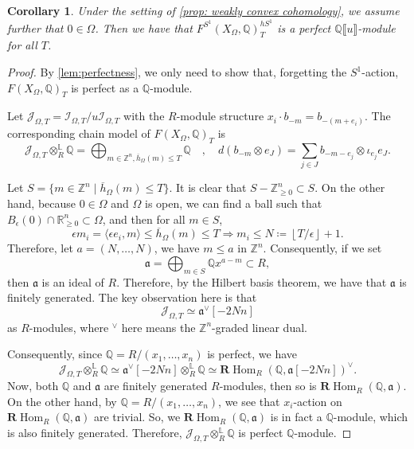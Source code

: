 \documentclass[11pt]{amsart}
\numberwithin{equation}{section}
\theoremstyle{plain}
\newtheorem{Coro}[coro]{Corollary}
\theoremstyle{definition}
\theoremstyle{remark}
\newcommand{\bQ} { {\mathbb{Q}}}
\newcommand{\bZ} { {\mathbb{Z}}}
\newcommand{\bR} { {\mathbb{R}}}
\newcommand{\fpw}[1]{{\llbracket #1\rrbracket}}
\newcommand\Hom{\operatorname{Hom}}
\def\lf{\left\lfloor}
\def\rf{\right\rfloor}
\begin{document}
\begin{Coro}Under the setting of \autoref{prop: weakly convex cohomology}, we assume further that $0\in \Omega$. Then we have that $F^{S^1}(X_\Omega,\bQ)_T^{hS^1}$ is a perfect $\bQ\fpw{u}$-module for all $T$.
\end{Coro}
\begin{proof}By \autoref{lem:perfectness}, we only need to show that, forgetting the $S^1$-action, $F (X_\Omega,\bQ)_T$ is perfect as a $\bQ$-module. 

Let $\mathcal{J}_{\Omega,T}=\mathcal{I}_{\Omega,T}/u\mathcal{I}_{\Omega,T}$ with the $R$-module structure $x_i\cdot b_{-m}=b_{-(m+e_i)}$. The corresponding chain model of $F(X_\Omega,\bQ)_T$ is 
\[\mathcal{J}_{\Omega,T}\otimes^\mathbb{L}_R\bQ=\bigoplus_{m\in \bZ^n,\overline{h}_\Omega(m)\leq T} \bQ \quad ,\quad d(b_{-m}\otimes e_J)=\sum_{j\in J}b_{-m-e_j}\otimes \iota_{e_j}e_J.\] 

Let $S = \{m \in \bZ^n \mid \overline{h}_\Omega(m)\leq T\}$. It is clear that $S-\bZ^n_{\geq 0} \subset S$. On the other hand, because $0\in \Omega$ and $\Omega$ is open, we can find a ball such that $B_\epsilon(0)\cap \bR^n_{\geq 0}\subset \Omega$, and then for all $m\in S$,
\[\epsilon m_i =\langle \epsilon e_i,m\rangle \leq \overline{h}_\Omega(m)\leq T\Rightarrow m_i\leq N\coloneqq \lf T/\epsilon \rf +1.\]
Therefore, let $a=(N,\dots,N)$, we have $m\leq a $ in $\bZ^n$.
Consequently, if we set
\[\mathfrak{a}=\bigoplus_{m\in S} \bQ x^{a-m}\subset R,\]
then $\mathfrak{a}$ is an ideal of $R$. Therefore, by the Hilbert basis theorem, we have that $\mathfrak{a}$ is finitely generated. The key observation here is that
\[\mathcal{J}_{\Omega,T}\simeq \mathfrak{a}^\vee[-2Nn]\]
as $R$-modules, where $^\vee$ here means the $\bZ^n$-graded linear dual.

Consequently, since $\bQ=R/(x_1,\dots,x_n)$ is perfect, we have
\[\mathcal{J}_{\Omega,T}\otimes^\mathbb{L}_R\bQ\simeq \mathfrak{a}^\vee[-2Nn]\otimes^\mathbb{L}_R\bQ\simeq \mathbf{R}\Hom_{R}(\bQ,\mathfrak{a}[-2Nn])^\vee.\] 
Now, both $\bQ$ and $\mathfrak{a}$ are finitely generated $R$-modules, then so is $\mathbf{R}\Hom_{R}(\bQ,\mathfrak{a})$. On the other hand, by $\bQ=R/(x_1,\dots,x_n)$, we see that $x_i$-action on $\mathbf{R}\Hom_{R}(\bQ,\mathfrak{a})$ are trivial. So, we $\mathbf{R}\Hom_{R}(\bQ,\mathfrak{a})$ is in fact a $\bQ$-module, which is also finitely generated. 
Therefore, $\mathcal{J}_{\Omega,T}\otimes^\mathbb{L}_R\bQ$ is perfect $\bQ$-module.
\end{proof}
\end{document}
